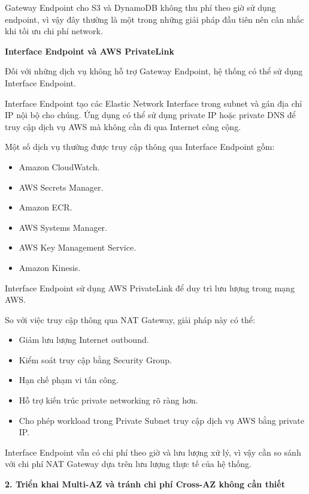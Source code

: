 Gateway Endpoint cho S3 và DynamoDB không thu phí theo giờ sử dụng
endpoint, vì vậy đây thường là một trong những giải pháp đầu tiên nên
cân nhắc khi tối ưu chi phí network.

\vspace{0.5em}\noindent\textbf{Interface Endpoint và AWS
PrivateLink}\par

Đối với những dịch vụ không hỗ trợ Gateway Endpoint, hệ thống có thể sử
dụng Interface Endpoint.

Interface Endpoint tạo các Elastic Network Interface trong subnet và gán
địa chỉ IP nội bộ cho chúng. Ứng dụng có thể sử dụng private IP hoặc
private DNS để truy cập dịch vụ AWS mà không cần đi qua Internet công
cộng.

Một số dịch vụ thường được truy cập thông qua Interface Endpoint gồm:

\begin{itemize}
\tightlist
\item
  Amazon CloudWatch.
\item
  AWS Secrets Manager.
\item
  Amazon ECR.
\item
  AWS Systems Manager.
\item
  AWS Key Management Service.
\item
  Amazon Kinesis.
\end{itemize}

Interface Endpoint sử dụng AWS PrivateLink để duy trì lưu lượng trong
mạng AWS.

So với việc truy cập thông qua NAT Gateway, giải pháp này có thể:

\begin{itemize}
\tightlist
\item
  Giảm lưu lượng Internet outbound.
\item
  Kiểm soát truy cập bằng Security Group.
\item
  Hạn chế phạm vi tấn công.
\item
  Hỗ trợ kiến trúc private networking rõ ràng hơn.
\item
  Cho phép workload trong Private Subnet truy cập dịch vụ AWS bằng
  private IP.
\end{itemize}

Interface Endpoint vẫn có chi phí theo giờ và lưu lượng xử lý, vì vậy
cần so sánh với chi phí NAT Gateway dựa trên lưu lượng thực tế của hệ
thống.

\vspace{0.5em}\noindent\textbf{2. Triển khai Multi-AZ và tránh chi phí Cross-AZ không cần
thiết}\par

